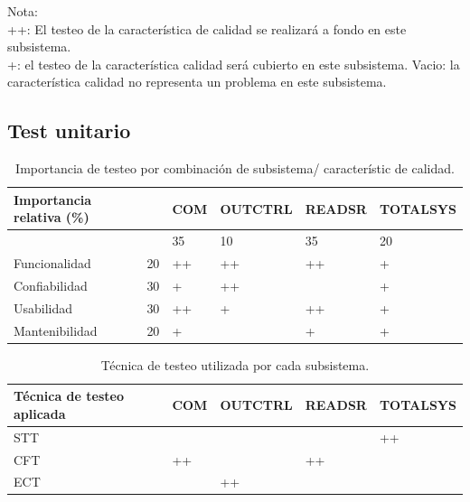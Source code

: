 \documentclass[11pt]{article}
\begin{document}
Nota:\\
++: El testeo de la característica de calidad se realizará a fondo en este
subsistema.\\
+: el testeo de la característica calidad será cubierto en este subsistema.
Vacio: la característica calidad no representa un problema en este subsistema.
\\

\subsection{Test unitario}
\FloatBarrier
\begin{table}[!ht]
    \centering
    \begin{tabular}{|l|l|l|l|l|l|}\hline \hline
        \rowcolor[HTML]{d6c6c3}
        Importancia relativa (\%) &    & COM & OUTCTRL & READSR & TOTALSYS \\
        \hline

                                  &    & 35  & 10      & 35     & 20       \\
        Funcionalidad             & 20 & ++  & ++      & ++     & +        \\
        Confiabilidad             & 30 & +   & ++      &        & +        \\
        Usabilidad                & 30 & ++  & +       & ++     & +        \\
        Mantenibilidad            & 20 & +   &         & +      & +        \\
        \hline
    \end{tabular}
    \caption{Importancia de testeo por combinación de subsistema/ característic
        de calidad.}
\end{table}

\FloatBarrier
\begin{table}[!ht]
    \centering
    \begin{tabular}{|l|l|l|l|l|}\hline \hline
        \rowcolor[HTML]{d6c6c3}
        Técnica de testeo aplicada & COM & OUTCTRL & READSR & TOTALSYS \\
        \hline
        STT                        &     &         &        & ++       \\
        CFT                        & ++  &         & ++     &          \\
        ECT                        &     & ++      &        &          \\
        \hline
    \end{tabular}
    \caption{Técnica de testeo utilizada por cada subsistema.}
\end{table}
\end{document}
